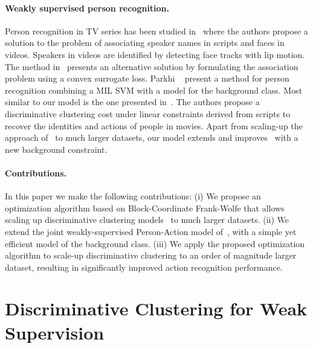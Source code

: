 \documentclass[10pt,twocolumn,letterpaper]{article}
\begin{document}
\vspace{-.4cm}
\paragraph{Weakly supervised person recognition.}
Person recognition in TV series has been studied in~\cite{everingham06hello,sivic09who} where the authors propose a solution to the problem of associating speaker names in scripts and faces in videos. Speakers in videos are identified by detecting face tracks with lip motion.
The method in~\cite{cour09learning} presents an alternative solution by formulating the association problem using a convex surrogate loss. 
Parkhi \etal~\cite{parkhi15it} present a method for person recognition combining a MIL SVM with a model for the background class.
Most similar to our model is the one presented in~\cite{bojanowski13finding}.
The authors propose a discriminative clustering cost under linear constraints derived from scripts to recover the identities and actions of people in movies.
Apart from scaling-up the approach of~\cite{bojanowski13finding} to much larger datasets, our model extends and improves~\cite{bojanowski13finding} with a new background constraint.
\vspace{-.3cm}









\paragraph{Contributions.}
In this paper we make the following contributions:
(i) We propose an optimization algorithm based on Block-Coordinate Frank-Wolfe that allows scaling up discriminative clustering models~\cite{bach07diffrac} to much larger datasets.
(ii) We extend the joint weakly-supervised Person-Action model of~\cite{bojanowski13finding}, with a simple yet efficient model of the background class. 
(iii) We apply the proposed optimization algorithm to scale-up discriminative clustering to an order of magnitude larger dataset, resulting in significantly improved action recognition performance.

 


\section{Discriminative Clustering for Weak Supervision}
\end{document}
